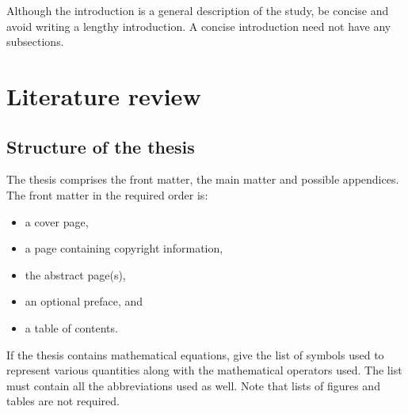 \documentclass[english, 12pt, a4paper, sci, utf8, a-2b, online]{aaltothesis}
\begin{document}
Although the introduction is a general description of the study, be concise and 
avoid writing a lengthy introduction. A concise introduction need not have any 
subsections.

\clearpage

\section{Literature review}
\subsection{Structure of the thesis}

The thesis comprises the front matter, the main matter and possible appendices.
The front matter in the required order is:

\begin{itemize}
	\item a cover page,
	\item a page containing copyright information,
	\item the abstract page(s),
	\item an optional preface, and
	\item a table of contents.
\end{itemize}

If the thesis contains mathematical equations, give the list of symbols used to 
represent various quantities along with the mathematical operators used.
The list must contain all the abbreviations used as well. Note that lists of
figures and tables are not required.
\end{document}
